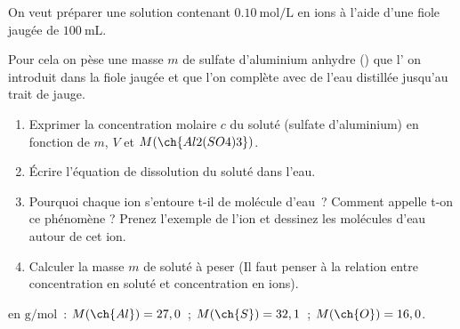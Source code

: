 On veut préparer une solution contenant $\qty{0.10}{\mol\per\L}$ en ions
 à l'aide d'une fiole jaugée de $\qty{100}{\mL}$.

Pour cela on pèse une masse $m$ de sulfate d'aluminium anhydre ()
que l' on introduit dans la fiole jaugée et que l'on complète avec de l'eau
distillée jusqu'au trait de jauge.
\begin{enumerate}
    \item Exprimer la concentration molaire $c$ du soluté (sulfate d'aluminium)
          en fonction de $m$, $V$ et $M(\ch{Al2(SO4)3})$.
    \item Écrire l'équation de dissolution du soluté dans l'eau.
    \item Pourquoi chaque ion s'entoure t-il de molécule d'eau~? Comment appelle
          t-on ce phénomène ? Prenez l'exemple de l'ion  et
          dessinez les molécules d'eau autour de cet ion.
    \item Calculer la masse $m$ de soluté à peser (Il faut penser à la relation
          entre concentration en soluté et concentration en
          ions).
\end{enumerate}

\begin{donnees}
    en $\unit{\g\per\mol}$~: $M(\ch{Al})=27,0$~; $M(\ch{S})=32,1$~;
    $M(\ch{O})=16,0$.
\end{donnees}
